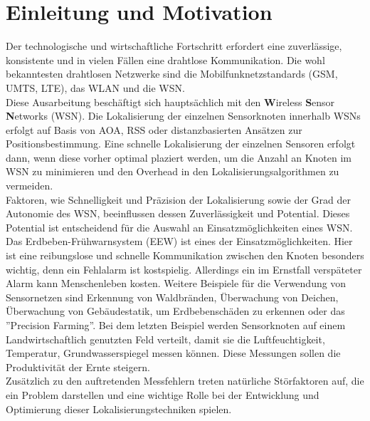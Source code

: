 \documentclass[12pt, a4wide]{scrreprt}
\begin{document}
\chapter{Einleitung und Motivation}
Der technologische und wirtschaftliche Fortschritt erfordert eine zuverlässige, konsistente und in vielen Fällen eine drahtlose Kommunikation. Die wohl bekanntesten drahtlosen Netzwerke sind die Mobilfunknetzstandards (GSM, UMTS, LTE), das WLAN und die WSN.\\
\indent 
Diese Ausarbeitung beschäftigt sich hauptsächlich mit den {\bf W}ireless {\bf S}ensor {\bf N}etworks (WSN). Die Lokalisierung der einzelnen Sensorknoten innerhalb WSNs erfolgt auf Basis von AOA, RSS oder distanzbasierten Ansätzen zur Positionsbestimmung. Eine schnelle Lokalisierung der einzelnen Sensoren erfolgt dann, wenn diese vorher optimal plaziert werden, um die Anzahl an Knoten im WSN zu minimieren und den Overhead in den Lokalisierungsalgorithmen zu vermeiden\cite{anchor_placement}.\\
\indent
Faktoren, wie Schnelligkeit und Präzision der Lokalisierung sowie der Grad der Autonomie des WSN, beeinflussen dessen Zuverlässigkeit und Potential. Dieses Potential ist entscheidend für die Auswahl an Einsatzmöglichkeiten eines WSN. Das Erdbeben-Frühwarnsystem (EEW) ist eines der Einsatzmöglichkeiten. Hier ist eine reibungslose und schnelle Kommunikation zwischen den Knoten besonders wichtig, denn ein Fehlalarm ist kostspielig. Allerdings ein im Ernstfall verspäteter Alarm kann Menschenleben kosten. Weitere Beispiele für die Verwendung von Sensornetzen sind Erkennung von Waldbränden, Überwachung von Deichen, Überwachung von Gebäudestatik, um Erdbebenschäden zu erkennen\cite{building_monitoring} oder das ''Precision Farming''. Bei dem letzten Beispiel werden Sensorknoten auf einem Landwirtschaftlich genutzten Feld verteilt, damit sie die Luftfeuchtigkeit, Temperatur, Grundwasserspiegel messen können. Diese Messungen sollen die Produktivität der Ernte steigern.\\
\indent
Zusätzlich zu den auftretenden Messfehlern treten natürliche Störfaktoren auf, die ein Problem darstellen und eine wichtige Rolle bei der Entwicklung und Optimierung dieser Lokalisierungstechniken spielen.
\end{document}
